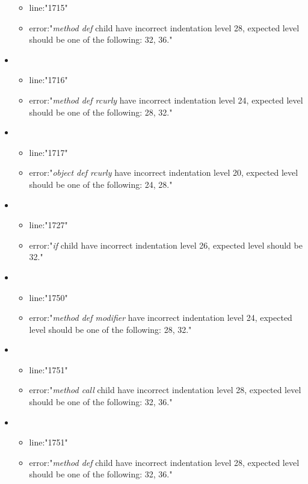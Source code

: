 \begin{itemize}
\begin{itemize}
		\item line:"1715" 
		\item error:"\emph{method def} child have incorrect indentation level 28, expected level should be one of the following: 32, 36." 
	\end{itemize}
	\item 
	\begin{itemize} 
		\item line:"1716" 
		\item error:"\emph{method def rcurly} have incorrect indentation level 24, expected level should be one of the following: 28, 32." 
	\end{itemize}
	\item 
	\begin{itemize} 
		\item line:"1717" 
		\item error:"\emph{object def rcurly} have incorrect indentation level 20, expected level should be one of the following: 24, 28." 
	\end{itemize}
	\item 
	\begin{itemize} 
		\item line:"1727" 
		\item error:"\emph{if} child have incorrect indentation level 26, expected level should be 32." 
	\end{itemize}
	\item 
	\begin{itemize} 
		\item line:"1750" 
		\item error:"\emph{method def modifier} have incorrect indentation level 24, expected level should be one of the following: 28, 32." 
	\end{itemize}
	\item 
	\begin{itemize} 
		\item line:"1751" 
		\item error:"\emph{method call} child have incorrect indentation level 28, expected level should be one of the following: 32, 36." 
	\end{itemize}
	\item 
	\begin{itemize} 
		\item line:"1751" 
		\item error:"\emph{method def} child have incorrect indentation level 28, expected level should be one of the following: 32, 36." 
	\end{itemize}

\end{itemize}
